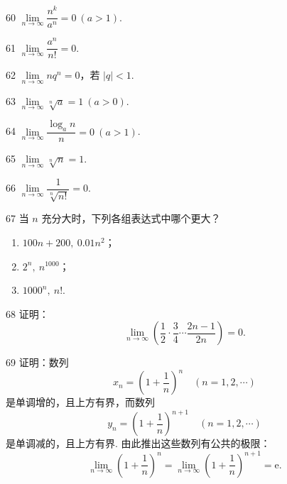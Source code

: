\begin{prob}[M]{60}
$\lim\limits_{n\to\infty} \dfrac{n^k}{a^n} = 0\ (a > 1)$.
\end{prob}

\begin{prob}[M]{61}
$\lim\limits_{n\to\infty} \dfrac{a^n}{n!} = 0$.
\end{prob}

\begin{prob}[M]{62}
$\lim\limits_{n\to\infty} nq^n = 0$，若 $|q| < 1$.
\end{prob}

\begin{prob}[M]{63}
$\lim\limits_{n\to\infty} \sqrt[n]{a} = 1\ (a > 0)$.
\end{prob}

\begin{prob}[M]{64}
$\lim\limits_{n\to\infty} \dfrac{\log_a n}{n} = 0\ (a > 1)$.
\end{prob}

\begin{prob}[M]{65}
$\lim\limits_{n\to\infty} \sqrt[n]{n} = 1$.
\end{prob}

\begin{prob}[M]{66}
$\lim\limits_{n\to\infty} \dfrac{1}{\sqrt[n]{n!}} = 0$.
\end{prob}

\begin{prob}[L]{67}
当 $n$ 充分大时，下列各组表达式中哪个更大？
\begin{enumerate}[label=(\alph*), itemsep=2pt, topsep=3pt]
\item $100n + 200,\ 0.01n^2$；
\item $2^n,\ n^{1000}$；
\item $1000^n,\ n!$.
\end{enumerate}
\end{prob}

\begin{prob}[M]{68}
证明：
\[
\lim_{n\to\infty} \left(\frac{1}{2}\cdot\frac{3}{4}\cdots\frac{2n-1}{2n}\right) = 0.
\]
\end{prob}

\begin{prob}[M]{69}
证明：数列
\[
x_n = \left(1 + \frac{1}{n}\right)^n \quad (n=1,2,\cdots)
\]
是单调增的，且上方有界，而数列
\[
y_n = \left(1 + \frac{1}{n}\right)^{n+1} \quad (n=1,2,\cdots)
\]
是单调减的，且上方有界. 由此推出这些数列有公共的极限：
\[
\lim_{n\to\infty} \left(1 + \frac{1}{n}\right)^n = \lim_{n\to\infty} \left(1 + \frac{1}{n}\right)^{n+1} = \mathrm{e}.
\]
\end{prob}

